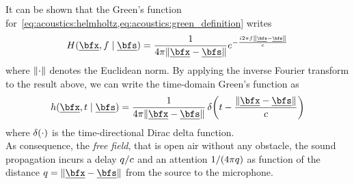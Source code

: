 \mynewline
It can be shown  that the Green's function for~\cref{eq:acoustics:helmholtz,eq:acoustics:green_definition} writes
\begin{equation}
    \label{eq:acoustics:greenFreeFreq}
    H(\positionMicrophone, f \mid \positionSource) = \frac{1}{4 \pi \norm{\positionMicrophone - \positionSource}} \cste^{- \frac{\csti 2 \pi f \norm{\positionMicrophone - \positionSource}}{\speedOfSound}}
\end{equation}
where $\norm{\cdot}$ denotes the Euclidean norm.
By applying the inverse Fourier transform to the result above, we can write the time-domain Green's function as
\begin{equation}
    \label{eq:acoustics:greenFreeTime}
    h(\positionMicrophone, t \mid \positionSource) =
        \frac{1}{4 \pi \norm{\positionMicrophone - \positionSource}}
        \diracOf{t - \frac{\norm{\positionMicrophone - \positionSource}}{\speedOfSound}}
\end{equation}
where $\diracOf{\cdot}$ is the time-directional Dirac delta function.
\\As consequence, the \textit{free field}, that is open air without any obstacle, the  sound propagation incurs a delay $q / c$
and an attention $1 / (4 \pi q)$ as function of the distance
$ \distMicSrc = \norm{\positionMicrophone - \positionSource}$ from the source to the microphone.

